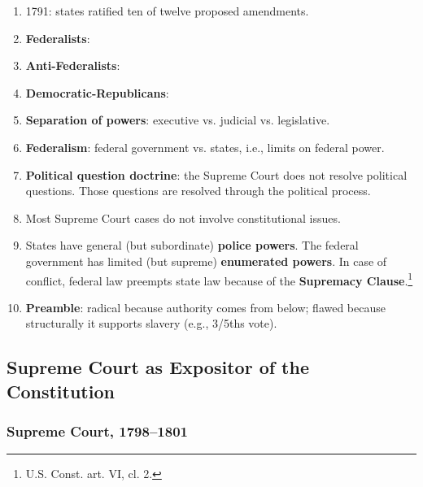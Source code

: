 \begin{enumerate}
\begin{enumerate}
        shall not be done which there is no power to do?~.~.~.~it is evident 
        it would furnish to men disposed to usurp, a plausible pretence for 
        claiming that power.''\footnote{Casebook p. 25.}
        \item Anti-federalist responses to Hamilton's argument pointed out 
        that the Constitution emphasizes limitations elsewhere, e.g., the 
        limitation on granting titles of nobility.\footnote{U.S. Const. art. 
        I, \S\ 9; casebook p. 26.}
    \end{enumerate}
    \item 1791: states ratified ten of twelve proposed amendments.
    \item \textbf{Federalists}: %
    \item \textbf{Anti-Federalists}: %
    \item \textbf{Democratic-Republicans}: %
    \item \textbf{Separation of powers}: executive vs. judicial vs. 
    legislative.
    \item \textbf{Federalism}: federal government vs. states, i.e., limits on 
    federal power.
    \item \textbf{Political question doctrine}: the Supreme Court does not 
    resolve political questions. Those questions are resolved through the 
    political process.
    \item Most Supreme Court cases do not involve constitutional issues.
    \item States have general (but subordinate) \textbf{police powers}. The 
    federal government has limited (but supreme) \textbf{enumerated powers}. 
    In case of conflict, federal law preempts state law because of the 
    \textbf{Supremacy Clause}.\footnote{U.S. Const. art. VI, cl. 2.}
    \item \textbf{Preamble}: radical because authority comes from below; 
    flawed because structurally it supports slavery (e.g., 3/5ths vote).
\end{enumerate}

\subsection{Supreme Court as Expositor of the Constitution}

\subsubsection{Supreme Court, 1798--1801}

